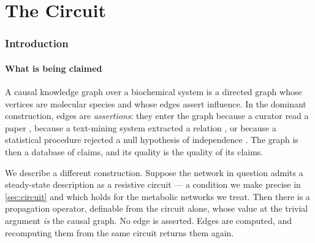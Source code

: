 \documentclass[11pt,twocolumn,a4paper]{article}
\theoremstyle{plain}
\theoremstyle{definition}
\theoremstyle{remark}
\begin{document}
\begin{abstract}
We then specify the interrogation layer. Reasoners are agents with disjoint
internal state that never exchange content, only addresses; allocation across
them is a water-filling problem with a single shadow price, so all reasoners are
graded rather than selected; agreement is measured by a Kuramoto order parameter
with a computable locking threshold. A drop in that order parameter localises to
the newly admitted reasoner's frequency mismatch rather than to decay of the
existing coordination, which we establish as \cref{prop:localisation} and which
makes the statistic diagnostic rather than merely descriptive.

Every quantitative claim is stated with the measurement that supports it or is
explicitly marked as unverified. Two claims we do not make: that this
construction is more accurate than curation, and that the recovered graph is
correct where the underlying kinetic parameters are wrong.
\end{abstract}

\tableofcontents

\part{The Circuit}

\section{Introduction}
\label{sec:intro}

\subsection{What is being claimed}

A causal knowledge graph over a biochemical system is a directed graph whose
vertices are molecular species and whose edges assert influence. In the
dominant construction, edges are \emph{assertions}: they enter the graph because
a curator read a paper \citep{Caspi2020,Kanehisa2000}, because a text-mining
system extracted a relation \citep{Percha2018}, or because a statistical
procedure rejected a null hypothesis of independence \citep{Spirtes2000,Pearl2009}.
The graph is then a database of claims, and its quality is the quality of its
claims.

We describe a different construction. Suppose the network in question admits a
steady-state description as a resistive circuit --- a condition we make precise
in \cref{sec:circuit} and which holds for the metabolic networks we treat. Then
there is a propagation operator, definable from the circuit alone, whose value at
the trivial argument \emph{is} the causal graph. No edge is asserted. Edges are
computed, and recomputing them from the same circuit returns them again.
\end{document}
